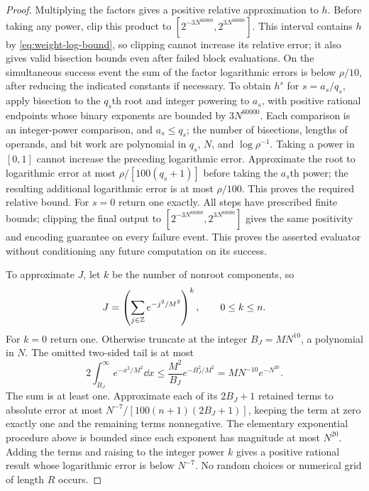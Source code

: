 \begin{proof}
Multiplying the factors gives a positive relative approximation to
$h$. Before taking any power, clip this product to
$[2^{-3N^{60000}},2^{3N^{60000}}]$. This interval contains $h$ by
\eqref{eq:weight-log-bound}, so clipping cannot increase its relative
error; it also gives valid bisection bounds even after failed block
evaluations. On the simultaneous success event the sum of the factor
logarithmic errors is below $\rho/10$, after reducing the indicated
constants if necessary. To obtain $h^s$ for $s=a_s/q_s$, apply bisection to the
$q_s$th root and integer powering to $a_s$, with positive rational
endpoints whose binary exponents are bounded by
$3N^{60000}$. Each comparison is an integer-power comparison, and
$a_s\le q_s$; the number of bisections, lengths of operands, and
bit work are polynomial in $q_s$, $N$, and $\log\rho^{-1}$.
Taking a power in $[0,1]$ cannot increase the preceding logarithmic
error. Approximate the root to logarithmic error at most
$\rho/[100(q_s+1)]$ before taking the $a_s$th power; the resulting
additional logarithmic error is at most $\rho/100$. This proves the
required relative bound. For $s=0$ return one exactly.
All steps have prescribed finite bounds; clipping the final output
to $[2^{-3N^{60000}},2^{3N^{60000}}]$ gives the same positivity and
encoding guarantee on every failure event. This proves the asserted
evaluator without conditioning any future computation on its success.

To approximate $J$, let $k$ be the number of nonroot components, so
\[
 J=\left(\sum_{j\in\mathbb Z}e^{-j^2/M^2}\right)^k,
 \qquad 0\le k\le n.
\]
For $k=0$ return one. Otherwise truncate at the integer
$B_J=MN^{10}$, a polynomial in $N$. The omitted two-sided tail is at
most
\[
 2\int_{B_J}^{\infty}e^{-x^2/M^2}\dd x
 \le\frac{M^2}{B_J}e^{-B_J^2/M^2}
 =MN^{-10}e^{-N^{20}}.
\]
The sum is at least one. Approximate each of its $2B_J+1$ retained
terms to absolute error at most
$N^{-7}/[100(n+1)(2B_J+1)]$, keeping the term at zero exactly one
and the remaining terms nonnegative. The elementary exponential
procedure above is bounded since each exponent has magnitude at most
$N^{20}$. Adding the terms and raising to the integer power $k$
gives a positive rational result whose logarithmic error is below
$N^{-7}$. No random choices or numerical grid of length $R$ occurs.
\end{proof}
